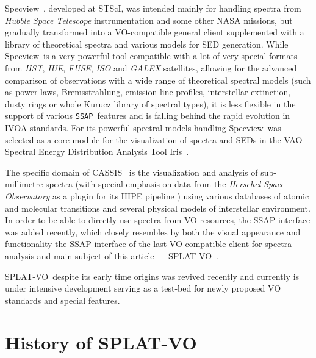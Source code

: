 \documentclass[final,authoryear,5p,times,twocolumn]{elsarticle}
\newcommand{\ssap}{\texttt{SSAP}}
\newcommand{\splatvo}{{\textsf{\small{SPLAT-VO}}}}
\newcommand{\specview}{\textsf{\small Specview}}
\newcommand{\iris}{\textsf{\small Iris}}
\newcommand{\cassis}{\textsf{\small CASSIS}}
\newcommand{\ascl}[1]{\href{http://www.ascl.net/#1}{ascl:#1}}
\begin{document}
\specview\ \citep[][\ascl{1210.016}]{2002SPIE.4847..410B}, developed at STScI,
was intended mainly for handling spectra from \emph{Hubble Space Telescope}
instrumentation and some other NASA missions, but gradually transformed into a
VO-compatible general client supplemented with a library of theoretical spectra
and various models for SED generation.  While \specview\ is a very powerful
tool compatible with a lot of very special formats from \emph{HST}, \emph{IUE},
\emph{FUSE}, \emph{ISO} and \emph{GALEX} satellites, allowing for the advanced
comparison of observations with a wide range of theoretical spectral models
(such as power laws, Bremsstrahlung, emission line profiles, interstellar
extinction, dusty rings or whole Kurucz library of spectral types), it is less
flexible in the support of various \ssap\ features and is falling behind the
rapid evolution in IVOA standards.  
For its powerful spectral models handling
\specview\   was  selected as a core module for the visualization of spectra
and SEDs in the VAO Spectral Energy Distribution Analysis Tool \iris\
\citep[][\ascl{1205.007}]{2014ASPC..485...19L}.

The specific domain of \cassis\
\citep[][\ascl{1402.013}]{2011IAUS..280P.120C} is the visualization and
analysis of  sub-millimetre  spectra (with special emphasis on data from the
\emph{Herschel Space Observatory} as a plugin for its HIPE pipeline \citep[][\ascl{1111.001}]{2012ASPC..461..733B}) using various
databases of atomic and molecular transitions and several physical models of
interstellar environment. In order to be able to directly use spectra from VO
resources, the SSAP interface was added recently, which closely resembles by
both the visual appearance and  functionality the SSAP interface of the last
VO-compatible client for spectra analysis and main subject of this article ---
\splatvo\ \citep[][\ascl{1402.008}]{sun243}. 

\splatvo\ despite its early time origins  was revived recently and
currently is under intensive development serving as a test-bed for newly
proposed VO standards and special features.





\section{History of SPLAT-VO}
\end{document}
